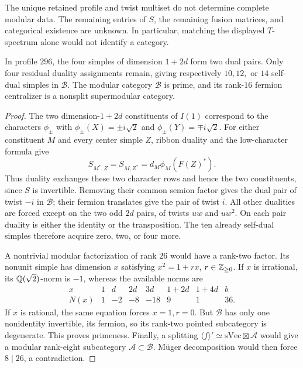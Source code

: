 \begin{remark}
The unique retained profile and twist multiset do not determine complete
modular data. The remaining entries of $S$, the remaining fusion
matrices, and categorical existence are unknown. In particular, matching
the displayed $T$-spectrum alone would not identify a category.
\end{remark}

\begin{proposition}
\label{prop:155-prime-centralizer}
In profile $296$, the four simples of dimension $1+2d$ form two dual
pairs. Only four residual duality assignments remain, giving respectively
$10,12,$ or $14$ self-dual simples in $\mathcal B$.
The modular category $\mathcal B$ is prime, and its rank-$16$ fermion
centralizer is a nonsplit supermodular category.
\end{proposition}
\begin{proof}
The two dimension-$1+2d$ constituents of $I(1)$ correspond to the
characters $\phi_\pm$ with
$\phi_\pm(X)=\pm i\sqrt2$ and $\phi_\pm(Y)=\mp i\sqrt2$.
For either constituent $M$ and every center simple $Z$, ribbon duality
and the low-character formula give
\[
 S_{M^*,Z}=S_{M,Z^*}
   =d_M\phi_M(F(Z)^*).
\]
Thus duality exchanges these two character rows and hence the two
constituents, since $S$ is invertible. Removing their common semion
factor gives the dual pair of twist $-i$ in $\mathcal B$; their fermion
translates give the pair of twist $i$. All other dualities are forced
except on the two odd $2d$ pairs, of twists $uw$ and $uw^2$.
On each pair duality is either the identity or the transposition. The
ten already self-dual simples therefore acquire zero, two, or four more.

A nontrivial modular factorization of rank $26$ would have a rank-two
factor. Its nonunit simple has dimension $x$ satisfying
$x^2=1+rx$, $r\in\mathbb Z_{\ge0}$. If $x$ is irrational, its
$\mathbb Q(\sqrt2)$-norm is $-1$, whereas the available norms are
\[
\begin{array}{c|rrrrrrr}
 x&1&d&2d&3d&1+2d&1+4d&b\\\hline
 N(x)&1&-2&-8&-18&9&1&36.
\end{array}
\]
If $x$ is rational, the same equation forces $x=1,r=0$. But
$\mathcal B$ has only one nonidentity invertible, its fermion, so its
rank-two pointed subcategory is degenerate. This proves primeness.
Finally, a splitting $\langle f\rangle'\simeq
\mathrm{sVec}\boxtimes\mathcal A$ would give a modular rank-eight
subcategory $\mathcal A\subset\mathcal B$. M\"uger decomposition
\cite{DGNO} would then force $8\mid26$, a contradiction.
\end{proof}


